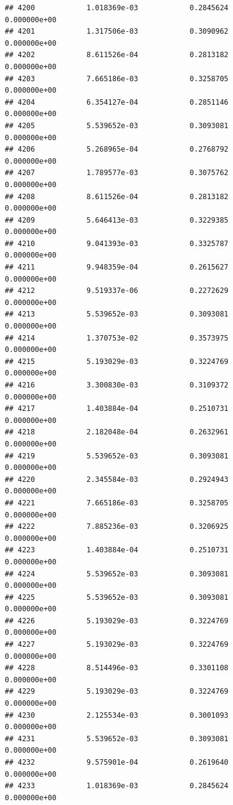 \documentclass[
]{article}
\begin{document}
\begin{verbatim}
## 4200            1.018369e-03            0.2845624            0.000000e+00
## 4201            1.317506e-03            0.3090962            0.000000e+00
## 4202            8.611526e-04            0.2813182            0.000000e+00
## 4203            7.665186e-03            0.3258705            0.000000e+00
## 4204            6.354127e-04            0.2851146            0.000000e+00
## 4205            5.539652e-03            0.3093081            0.000000e+00
## 4206            5.268965e-04            0.2768792            0.000000e+00
## 4207            1.789577e-03            0.3075762            0.000000e+00
## 4208            8.611526e-04            0.2813182            0.000000e+00
## 4209            5.646413e-03            0.3229385            0.000000e+00
## 4210            9.041393e-03            0.3325787            0.000000e+00
## 4211            9.948359e-04            0.2615627            0.000000e+00
## 4212            9.519337e-06            0.2272629            0.000000e+00
## 4213            5.539652e-03            0.3093081            0.000000e+00
## 4214            1.370753e-02            0.3573975            0.000000e+00
## 4215            5.193029e-03            0.3224769            0.000000e+00
## 4216            3.300830e-03            0.3109372            0.000000e+00
## 4217            1.403884e-04            0.2510731            0.000000e+00
## 4218            2.182048e-04            0.2632961            0.000000e+00
## 4219            5.539652e-03            0.3093081            0.000000e+00
## 4220            2.345584e-03            0.2924943            0.000000e+00
## 4221            7.665186e-03            0.3258705            0.000000e+00
## 4222            7.885236e-03            0.3206925            0.000000e+00
## 4223            1.403884e-04            0.2510731            0.000000e+00
## 4224            5.539652e-03            0.3093081            0.000000e+00
## 4225            5.539652e-03            0.3093081            0.000000e+00
## 4226            5.193029e-03            0.3224769            0.000000e+00
## 4227            5.193029e-03            0.3224769            0.000000e+00
## 4228            8.514496e-03            0.3301108            0.000000e+00
## 4229            5.193029e-03            0.3224769            0.000000e+00
## 4230            2.125534e-03            0.3001093            0.000000e+00
## 4231            5.539652e-03            0.3093081            0.000000e+00
## 4232            9.575901e-04            0.2619640            0.000000e+00
## 4233            1.018369e-03            0.2845624            0.000000e+00

\end{verbatim}
\end{document}
